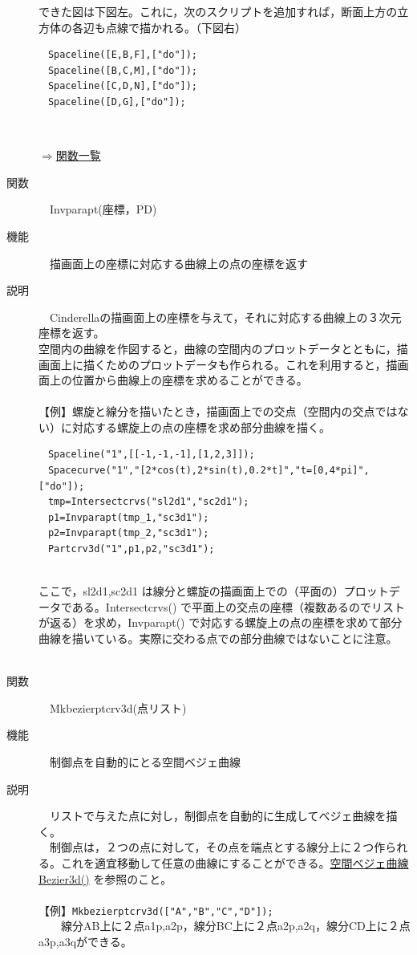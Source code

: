 \documentclass[papersize,a4paper,12pt,uplatex]{jsarticle}
\begin{document}
\begin{description}
できた図は下図左。これに，次のスクリプトを追加すれば，断面上方の立方体の各辺も点線で描かれる。（下図右）
\begin{verbatim}
　Spaceline([E,B,F],["do"]);
　Spaceline([B,C,M],["do"]);
　Spaceline([C,D,N],["do"]);
　Spaceline([D,G],["do"]);
\end{verbatim}
　　　

\begin{flushright} \hyperlink{functionlist3d}{$\Rightarrow$関数一覧}\end{flushright}

\hypertarget{invparapt}{}
\item[関数]　Invparapt(座標，PD)
\item[機能]　描画面上の座標に対応する曲線上の点の座標を返す
\item[説明]　Cinderellaの描画面上の座標を与えて，それに対応する曲線上の３次元座標を返す。
\\
空間内の曲線を作図すると，曲線の空間内のプロットデータとともに，描画面上に描くためのプロットデータも作られる。これを利用すると，描画面上の位置から曲線上の座標を求めることができる。\\
　\\
【例】螺旋と線分を描いたとき，描画面上での交点（空間内の交点ではない）に対応する螺旋上の点の座標を求め部分曲線を描く。\\
\begin{verbatim}
　Spaceline("1",[[-1,-1,-1],[1,2,3]]);
　Spacecurve("1","[2*cos(t),2*sin(t),0.2*t]","t=[0,4*pi]",["do"]);
　tmp=Intersectcrvs("sl2d1","sc2d1");
　p1=Invparapt(tmp_1,"sc3d1");
　p2=Invparapt(tmp_2,"sc3d1");
　Partcrv3d("1",p1,p2,"sc3d1"); 
\end{verbatim}
　　　　　　　　\\
ここで，sl2d1,sc2d1 は線分と螺旋の描画面上での（平面の）プロットデータである。Intersectcrvs() で平面上の交点の座標（複数あるのでリストが返る）を求め，Invparapt() で対応する螺旋上の点の座標を求めて部分曲線を描いている。実際に交わる点での部分曲線ではないことに注意。\\
　\\

\hypertarget{mkbezierptcrv3d}{}
\item[関数]　Mkbezierptcrv3d(点リスト)
\item[機能]　制御点を自動的にとる空間ベジェ曲線
\item[説明]　リストで与えた点に対し，制御点を自動的に生成してベジェ曲線を描く。\\
　制御点は，２つの点に対して，その点を端点とする線分上に２つ作られる。これを適宜移動して任意の曲線にすることができる。\hyperlink{bezier3d}{空間ベジェ曲線 Bezier3d()} を参照のこと。\\
　\\
【例】\verb|Mkbezierptcrv3d(["A","B","C","D"]);|\\
　　線分AB上に２点a1p,a2p，線分BC上に２点a2p,a2q，線分CD上に２点a3p,a3qができる。\\


\end{description}
\end{document}
